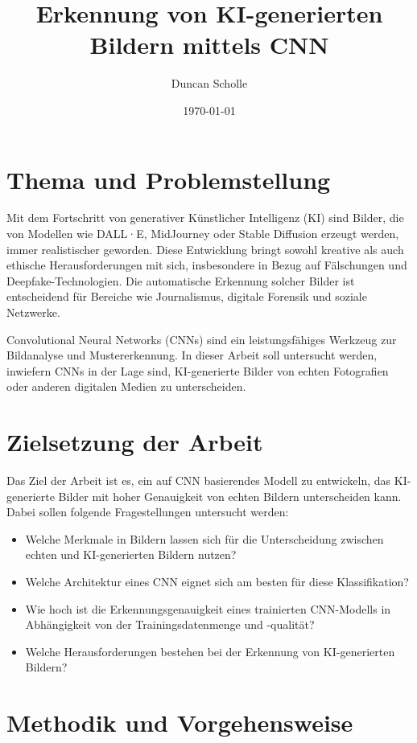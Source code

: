 \documentclass[a4paper,12pt]{article}
\title{Erkennung von KI-generierten Bildern mittels CNN}
\author{Duncan Scholle}
\date{\today}
\begin{document}
\maketitle

\section{Thema und Problemstellung}

Mit dem Fortschritt von generativer Künstlicher Intelligenz (KI) sind Bilder, die von Modellen wie DALL·E, MidJourney oder Stable Diffusion erzeugt werden, immer realistischer geworden. Diese Entwicklung bringt sowohl kreative als auch ethische Herausforderungen mit sich, insbesondere in Bezug auf Fälschungen und Deepfake-Technologien. Die automatische Erkennung solcher Bilder ist entscheidend für Bereiche wie Journalismus, digitale Forensik und soziale Netzwerke.

Convolutional Neural Networks (CNNs) sind ein leistungsfähiges Werkzeug zur Bildanalyse und Mustererkennung. In dieser Arbeit soll untersucht werden, inwiefern CNNs in der Lage sind, KI-generierte Bilder von echten Fotografien oder anderen digitalen Medien zu unterscheiden.

\section{Zielsetzung der Arbeit}

Das Ziel der Arbeit ist es, ein auf CNN basierendes Modell zu entwickeln, das KI-generierte Bilder mit hoher Genauigkeit von echten Bildern unterscheiden kann. Dabei sollen folgende Fragestellungen untersucht werden:

\begin{itemize}
    \item Welche Merkmale in Bildern lassen sich für die Unterscheidung zwischen echten und KI-generierten Bildern nutzen?
    \item Welche Architektur eines CNN eignet sich am besten für diese Klassifikation?
    \item Wie hoch ist die Erkennungsgenauigkeit eines trainierten CNN-Modells in Abhängigkeit von der Trainingsdatenmenge und -qualität?
    \item Welche Herausforderungen bestehen bei der Erkennung von KI-generierten Bildern?
\end{itemize}

\section{Methodik und Vorgehensweise}
\end{document}
